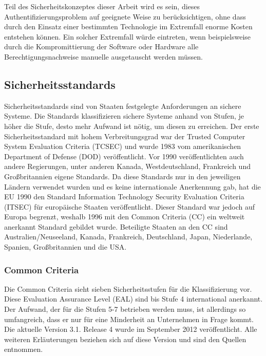 \documentclass[11pt,a4paper]{report}
\begin{document}
Teil des Sicherheitskonzeptes dieser Arbeit wird es sein, dieses Authentifizierungsproblem auf geeignete Weise zu berücksichtigen, ohne dass durch den Einsatz einer bestimmten Technologie im Extremfall enorme Kosten entstehen können. Ein solcher Extremfall würde eintreten, wenn beispielsweise durch die Kompromittierung der Software oder Hardware alle Berechtigungsnachweise manuelle ausgetauscht werden müssen.

\subsection{Sicherheitsstandards} \label{sec:sec_standard}

Sicherheitsstandards sind von Staaten festgelegte Anforderungen an sichere Systeme. Die Standards klassifizieren sichere Systeme anhand von Stufen, je höher die Stufe, desto mehr Aufwand ist nötig, um diesen zu erreichen. Der erste Sicherheitsstandard mit hohem Verbreitungsgrad war der Trusted Computer System Evaluation Criteria (TCSEC) und wurde 1983 vom amerikanischen Department of Defense (DOD) veröffentlicht. Vor 1990 veröffentlichten auch andere Regierungen, unter anderen Kanada, Westdeutschland, Frankreich und Großbritannien eigene Standards. Da diese Standards nur in den jeweiligen Ländern verwendet wurden und es keine internationale Anerkennung gab, hat die EU 1990 den Standard Information Technology Security Evaluation Criteria (ITSEC) für europäische Staaten veröffentlicht. Dieser Standard war jedoch auf Europa begrenzt, weshalb 1996 mit den Common Criteria (CC) ein weltweit anerkannt Standard gebildet wurde. Beteiligte Staaten an den CC sind Australien/Neuseeland, Kanada, Frankreich, Deutschland, Japan, Niederlande, Spanien, Großbritannien und die USA.

\subsubsection{Common Criteria}

Die Common Criteria sieht sieben Sicherheitsstufen für die Klassifizierung vor. Diese Evaluation Assurance Level (EAL) sind bis Stufe 4 international anerkannt. Der Aufwand, der für die Stufen 5-7 betrieben werden muss, ist allerdings so umfangreich, dass er nur für eine Minderheit an Unternehmen in Frage kommt. Die aktuelle Version 3.1. Release 4 wurde im September 2012 veröffentlicht. Alle weiteren Erläuterungen beziehen sich auf diese Version und sind den Quellen \cite{ccp1, ccp2, ccp3, bsi_ccguide} entnommen.
\end{document}
